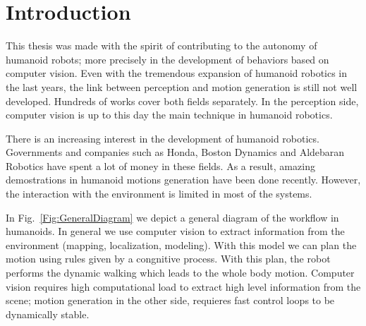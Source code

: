 
\chapter{Introduction} 
\label{Chap:Introduction}

This thesis was made with the spirit of contributing to the autonomy of humanoid robots; more precisely in the development of behaviors based on computer vision. Even with the tremendous expansion of humanoid robotics in the last years, the link between perception and motion generation is still not well developed. Hundreds of works cover both fields separately. In the perception side, computer vision is up to this day the main technique in humanoid robotics. 

There is an increasing interest in the development of humanoid robotics. Governments and companies such as Honda, Boston Dynamics and Aldebaran Robotics have spent a lot of money in these fields. As a result, amazing demostrations in humanoid motions generation have been done recently. However, the interaction with the environment is limited in most of the systems.

In Fig.~\ref{Fig:GeneralDiagram} we depict a general diagram of the workflow in humanoids. In general we use computer vision to extract information from the environment (mapping, localization, modeling). With this model we can plan the motion using rules given by a congnitive process. With this plan, the robot performs the dynamic walking which leads to the whole body motion. Computer vision requires high computational load to extract high level information from the scene; motion generation in the other side, requieres fast control loops to be dynamically stable. 

